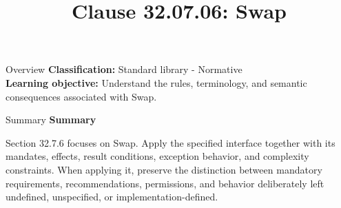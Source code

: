 \documentclass[10pt,letterpaper]{article}
\title{Clause 32.07.06: Swap}
\author{}
\date{}
\begin{document}
\maketitle
\begin{CornellOverviewBox}{Overview}
\textbf{Classification:} Standard library - Normative\\[2pt]
\textbf{Learning objective:} Understand the rules, terminology, and semantic consequences associated with Swap.
\end{CornellOverviewBox}\begin{CornellSummaryBox}{Summary}
{\sffamily\bfseries\color{Accent} Summary}\par\vspace{3pt}Section 32.7.6 focuses on Swap. Apply the specified interface together with its mandates, effects, result conditions, exception behavior, and complexity constraints. When applying it, preserve the distinction between mandatory requirements, recommendations, permissions, and behavior deliberately left undefined, unspecified, or implementation-defined.
\end{CornellSummaryBox}
\end{document}

